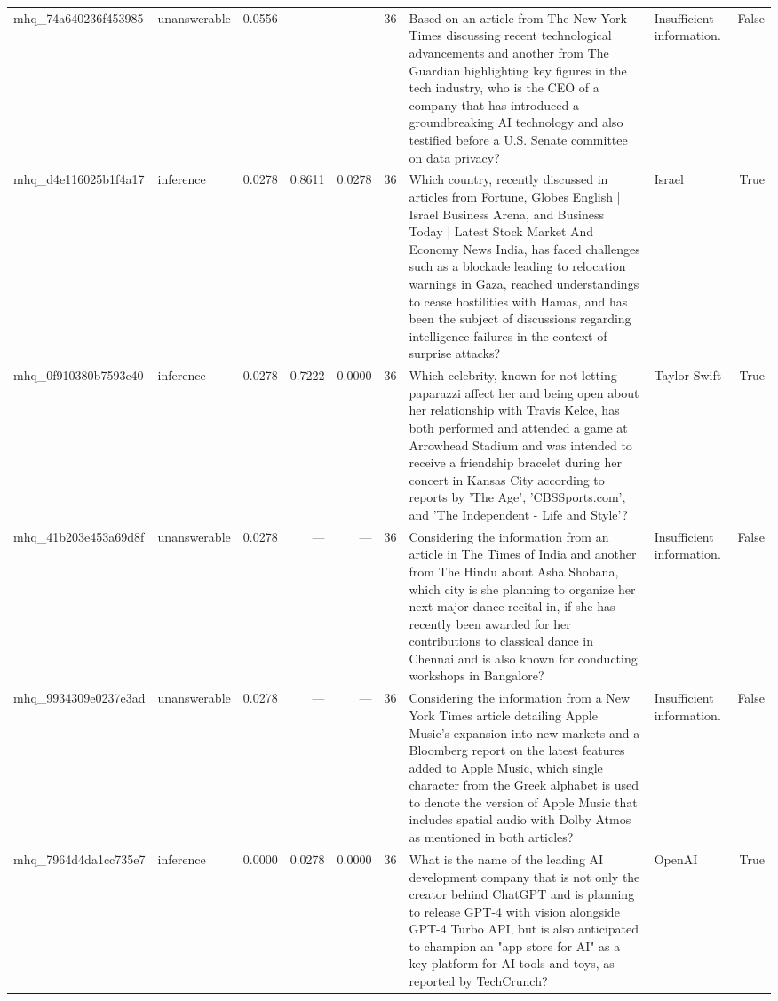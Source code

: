 \begin{tabular}{llrrrrllr}
mhq_74a640236f453985 & unanswerable & 0.0556 & — & — & 36 & Based on an article from The New York Times discussing recent technological advancements and another from The Guardian highlighting key figures in the tech industry, who is the CEO of a company that has introduced a groundbreaking AI technology and also testified before a U.S. Senate committee on data privacy? & Insufficient information. & False \\
mhq_d4e116025b1f4a17 & inference & 0.0278 & 0.8611 & 0.0278 & 36 & Which country, recently discussed in articles from Fortune, Globes English | Israel Business Arena, and Business Today | Latest Stock Market And Economy News India, has faced challenges such as a blockade leading to relocation warnings in Gaza, reached understandings to cease hostilities with Hamas, and has been the subject of discussions regarding intelligence failures in the context of surprise attacks? & Israel & True \\
mhq_0f910380b7593c40 & inference & 0.0278 & 0.7222 & 0.0000 & 36 & Which celebrity, known for not letting paparazzi affect her and being open about her relationship with Travis Kelce, has both performed and attended a game at Arrowhead Stadium and was intended to receive a friendship bracelet during her concert in Kansas City according to reports by 'The Age', 'CBSSports.com', and 'The Independent - Life and Style'? & Taylor Swift & True \\
mhq_41b203e453a69d8f & unanswerable & 0.0278 & — & — & 36 & Considering the information from an article in The Times of India and another from The Hindu about Asha Shobana, which city is she planning to organize her next major dance recital in, if she has recently been awarded for her contributions to classical dance in Chennai and is also known for conducting workshops in Bangalore? & Insufficient information. & False \\
mhq_9934309e0237e3ad & unanswerable & 0.0278 & — & — & 36 & Considering the information from a New York Times article detailing Apple Music's expansion into new markets and a Bloomberg report on the latest features added to Apple Music, which single character from the Greek alphabet is used to denote the version of Apple Music that includes spatial audio with Dolby Atmos as mentioned in both articles? & Insufficient information. & False \\
mhq_7964d4da1cc735e7 & inference & 0.0000 & 0.0278 & 0.0000 & 36 & What is the name of the leading AI development company that is not only the creator behind ChatGPT and is planning to release GPT-4 with vision alongside GPT-4 Turbo API, but is also anticipated to champion an "app store for AI" as a key platform for AI tools and toys, as reported by TechCrunch? & OpenAI & True \\

\end{tabular}
